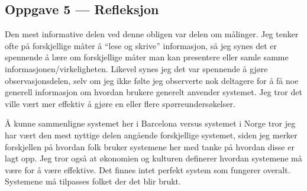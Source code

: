\documentclass{../../myassignment}
\begin{document}
	\subsection*{Oppgave 5 --- Refleksjon}

	Den mest informative delen ved denne obligen var delen om m{\aa}linger. Jeg tenker ofte p{\aa} forskjellige m{\aa}ter {\aa} ``lese og skrive'' informasjon, s{\aa} jeg synes det er spennende {\aa} l{\ae}re om forskjellige m{\aa}ter man kan presentere eller samle samme informasjonen/virkeligheten. Likevel synes jeg det var spennende {\aa} gj{\o}re observasjonsdelen, selv om jeg ikke f{\o}lte jeg observerte nok deltagere for {\aa} f{\aa} noe generell informasjon om hvordan brukere generelt anvender systemet. Jeg tror det ville v{\ae}rt mer effektiv {\aa} gj{\o}re en eller flere sp{\o}rreunders{\o}kelser.

	{\AA} kunne sammenligne systemet her i Barcelona versus systemet i Norge tror jeg har v{\ae}rt den  mest nyttige delen ang{\aa}ende forskjellige systemet, siden jeg merker forskjellen p{\aa} hvordan folk bruker systemene her med tanke p{\aa} hvordan disse er lagt opp. Jeg tror ogs{\aa} at {\o}konomien og kulturen definerer hvordan systemene m{\aa} v{\ae}re for {\aa} v{\ae}re effektive. Det finnes intet perfekt system som fungerer overalt. Systemene m{\aa} tilpasses folket der det blir brukt.
\end{document}
